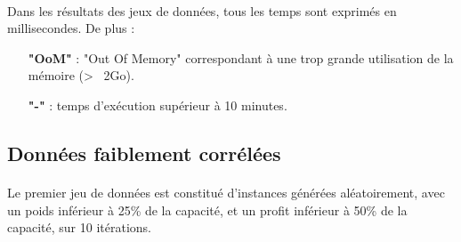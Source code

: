\documentclass[12pt]{article}
\begin{document}
\paragraph{}Dans les résultats des jeux de données, tous les temps sont exprimés en millisecondes. De plus :
\begin{itemize}
 \item[\textbf{"OoM"}] : "Out Of Memory" correspondant à une trop grande utilisation de la mémoire (> ~2Go).
 \item[\textbf{"-"}] : temps d'exécution supérieur à 10 minutes.
 \end{itemize}

\subsection{Données faiblement corrélées}

\paragraph{}Le premier jeu de données est constitué d'instances générées aléatoirement, avec un poids inférieur à 25\% de la capacité, et un profit inférieur à 50\% de la capacité, sur 10 itérations.
\end{document}
